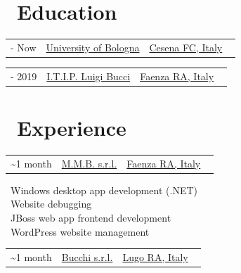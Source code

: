 \documentclass{article}
\makeatletter
\newcommand{\triple}[3]{
    \begin{tabularx}{\textwidth} {@{}>{\raggedright\arraybackslash}X >{\centering\arraybackslash}c >{\raggedleft\arraybackslash}X@{}}
    #1 & #2 & #3
    \end{tabularx}
}
\makeatother
\begin{document}
\begin{paracol}{2}
    \section*{\faGraduationCap \ Education}

    \begin{tcolorbox}[title=\href{https://corsi.unibo.it/1cycle/ComputerScienceEngineering}{Bachelor in Computer Science and Engineering}]
        \triple
            {\faCalendar* 2019 - Now}
            {\href{https://www.unibo.it/en/}{University of Bologna}}
            {\href{https://www.openstreetmap.org/relation/42809}{Cesena FC, Italy} \ \faCity}
    \end{tcolorbox}

    \begin{tcolorbox}[title=High School Diploma in Information Technology]
        \triple
            {\faCalendar* 2014 - 2019}
            {\href{https://www.itipfaenza.edu.it/}{I.T.I.P. Luigi Bucci}}
            {\href{https://www.openstreetmap.org/relation/43004}{Faenza RA, Italy} \ \faCity}
    \end{tcolorbox}

    \section*{\faBriefcase \ Experience}

    \begin{tcolorbox}[title=Software Developer Internship]
        \triple
            {\faCalendar* 2018 \textasciitilde 1 month}
            {\href{https://www.mmbsoftware.it/portalemmb/en/home}{M.M.B. s.r.l.}}
            {\href{https://www.openstreetmap.org/relation/43004}{Faenza RA, Italy} \ \faCity}
        \tcblower

        \faDesktop \ Windows desktop app development (.NET) \\
        \faBug \ Website debugging \\
        \faCoffee \ JBoss web app frontend development \\
        \faWordpress \ WordPress website management
    \end{tcolorbox}

    \begin{tcolorbox}[title=Software Developer Internship]
        \triple
            {\faCalendar* 2018 \textasciitilde 1 month}
            {\href{http://www.bucchi.it/en/}{Bucchi s.r.l.}}
            {\href{https://www.openstreetmap.org/relation/43140}{Lugo RA, Italy} \ \faCity}
        \tcblower


\end{tcolorbox}
\end{paracol}
\end{document}
